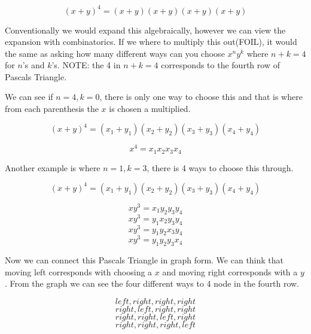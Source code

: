 \documentclass[addpoints]{exam}
\begin{document}
\begin{questions}
\begin{parts}
		$$(x+y)^4 = (x+y)(x+y)(x+y)(x+y)$$
		
		Conventionally we would expand this algebraically, however we can view the expansion with combinatorics. If we where to multiply this out(FOIL), it would the same as asking how many different ways can you choose $x^ny^k$ where $n+k=4$ for $n$'s and $k$'s. NOTE: the 4 in $n+k=4$ corresponds to the fourth row of Pascals Triangle.
		
		We can see if $n=4,k=0$, there is only one way to choose this and that is where from each parenthesis the $x$ is chosen a multiplied.  
		
		$$(x+y)^4 = (x_1+y_1)(x_2+y_2)(x_3+y_3)(x_4+y_4)$$
		
		$$x^4 = x_1x_2x_3x_4$$
		
		Another example is where $n=1,k=3$, there is 4 ways to choose this through.
		
		$$(x+y)^4 = (x_1+y_1)(x_2+y_2)(x_3+y_3)(x_4+y_4)$$
		
		$$xy^3 = x_1y_2y_3y_4$$
		$$xy^3 = y_1x_2y_3y_4$$
		$$xy^3 = y_1y_2x_3y_4$$
		$$xy^3 = y_1y_2y_3x_4$$
		
		Now we can connect this Pascals Triangle in graph form. We can think that moving left corresponds with choosing a $x$ and moving right corresponds with a $y$. From the graph we can see the four different ways to 4 node in the fourth row.
		
		$$left, right, right, right$$
		$$right, left, right, right$$
		$$right, right, left, right$$
		$$right, right, right, left$$
	\end{parts}



	\question




\end{questions}
\end{document}

